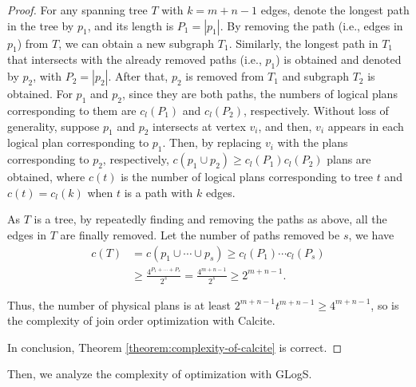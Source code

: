 \begin{proof}
    For any spanning tree $T$ with $k = m + n - 1$ edges, denote the longest path in the tree by $p_1$, and its length is $P_1 = |p_1|$.
    By removing the path (i.e., edges in $p_1$) from $T$, we can obtain a new subgraph $T_1$.
    Similarly, the longest path in $T_1$ that intersects with the already removed paths (i.e., $p_1$) is obtained and denoted by $p_2$, with $P_2 = |p_2|$.
    After that, $p_2$ is removed from $T_1$ and subgraph $T_2$ is obtained.
    For $p_1$ and $p_2$, since they are both paths, the numbers of logical plans corresponding to them are $c_l(P_1)$ and $c_l(P_2)$, respectively.
    Without loss of generality, suppose $p_1$ and $p_2$ intersects at vertex $v_i$, and then, $v_i$ appears in each logical plan corresponding to $p_1$.
    Then, by replacing $v_i$ with the plans corresponding to $p_2$, respectively, $c(p_1 \cup p_2) \geq c_l(P_1)c_l(P_2)$ plans are obtained, where $c(t)$ is the number of logical plans corresponding to tree $t$ and $c(t) = c_l(k)$ when $t$ is a path with $k$ edges.

    As $T$ is a tree, by repeatedly finding and removing the paths as above, all the edges in $T$ are finally removed.
    Let the number of paths removed be $s$, we have
    \begin{equation*}
        \begin{split}
            c(T) & = c(p_1 \cup \cdots \cup p_s) \geq c_l(P_1) \cdots c_l(P_s) \\
            & \geq \frac{4^{P_1 + \cdots + P_s}}{2^s} = \frac{4^{m + n - 1}}{2^s} \geq 2^{m+n-1}.
        \end{split}
    \end{equation*}



    Thus, the number of physical plans is at least $2^{m+n-1}t^{m+n-1} \geq 4^{m+n-1}$, so is the complexity of join order optimization with Calcite.

    In conclusion, Theorem \ref{theorem:complexity-of-calcite} is correct.
\end{proof}

Then, we analyze the complexity of optimization with GLogS.

